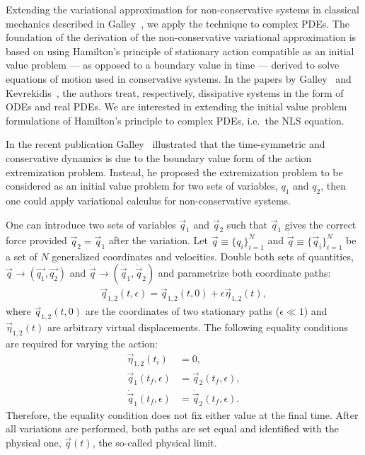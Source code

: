 Extending the variational approximation for non-conservative systems in classical mechanics described in Galley~\cite{Galley}, we apply the technique to complex PDEs.  The foundation of the derivation of the non-conservative variational approximation is based on using Hamilton's principle of stationary action compatible as an initial value problem --- as opposed to a boundary value in time --- derived to solve equations of motion used in conservative systems.  In the papers by Galley~\cite{Galley} and Kevrekidis~\cite{Kevrekidis2014}, the authors treat, respectively, dissipative systems in the form of ODEs and real PDEs.  We are interested in extending the initial value problem formulations of Hamilton's principle to complex PDEs, i.e.~the NLS equation.  

In the recent publication Galley~\cite{Galley} illustrated that the time-symmetric and conservative dynamics is due to the boundary value form of the action extremization problem.  Instead, he proposed the extremization problem to be considered as an initial value problem for two sets of variables, $q_1$ and $q_2$, then one could apply variational calculus for non-conservative systems.

One can introduce two sets of variables $\vec{q}_1$ and $\vec{q}_2$ such that $\vec{q}_1$ gives the correct force provided $\vec{q}_2 = \vec{q}_1$ after the variation.  Let $\vec{q} \equiv \{q_i\}_{i=1}^N$ and $\dot{\vec{q}} \equiv  \{ \dot{\vec{q}}_i \}_{i=1}^N$ be a set of $N$ generalized coordinates and velocities.  Double both sets of quantities, $\vec{q} \rightarrow (\vec{q_1}, \vec{q_2})$ and $\dot{\vec{q}} \rightarrow (\dot{\vec{q}}_1, \dot{\vec{q}}_2)$ and parametrize both coordinate paths:
\begin{align}
\vec{q}_{1,2} (t, \epsilon) = \vec{q}_{1,2} (t, 0) + \epsilon \vec{\eta}_{1,2}(t), 
\end{align}
where $\vec{q}_{1,2} (t, 0)$ are the coordinates of two stationary paths ($\epsilon \ll 1$) and $\vec{\eta}_{1,2}(t) $ are arbitrary virtual displacements.  The following equality conditions are required for varying the action:
\begin{align}
\vec{\eta}_{1,2}(t_i) &= 0, \\
\vec{q}_{1} (t_f, \epsilon) &= \vec{q}_{2} (t_f, \epsilon), \\
\dot{\vec{q}}_{1} (t_f, \epsilon) &= \dot{\vec{q}}_{2} (t_f, \epsilon).
\end{align}
Therefore, the equality condition does not fix either value at the final time.  After all variations are performed, both paths are set equal and identified with the physical one, $\vec{q}(t)$, the so-called physical limit.  

